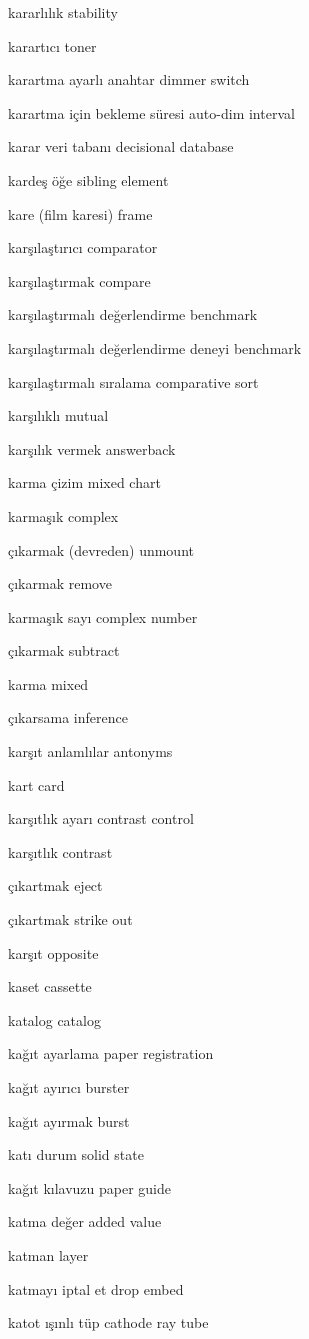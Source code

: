 \documentclass[12pt,fleqn]{article}\usepackage{../../common}
\begin{document}
kararlılık stability

karartıcı toner

karartma ayarlı anahtar dimmer switch

karartma için bekleme süresi auto-dim interval

karar veri tabanı decisional database

kardeş öğe sibling element

kare (film karesi) frame

karşılaştırıcı comparator

karşılaştırmak compare

karşılaştırmalı değerlendirme benchmark

karşılaştırmalı değerlendirme deneyi benchmark

karşılaştırmalı sıralama comparative sort

karşılıklı mutual

karşılık vermek answerback

karma çizim mixed chart

karmaşık complex

çıkarmak (devreden) unmount

çıkarmak remove

karmaşık sayı complex number

çıkarmak subtract

karma mixed

çıkarsama inference

karşıt anlamlılar antonyms

kart card

karşıtlık ayarı contrast control

karşıtlık contrast

çıkartmak eject

çıkartmak strike out

karşıt opposite

kaset cassette

katalog catalog

kağıt ayarlama paper registration

kağıt ayırıcı burster

kağıt ayırmak burst

katı durum solid state

kağıt kılavuzu paper guide

katma değer added value

katman layer

katmayı iptal et drop embed

katot ışınlı tüp cathode ray tube
\end{document}
